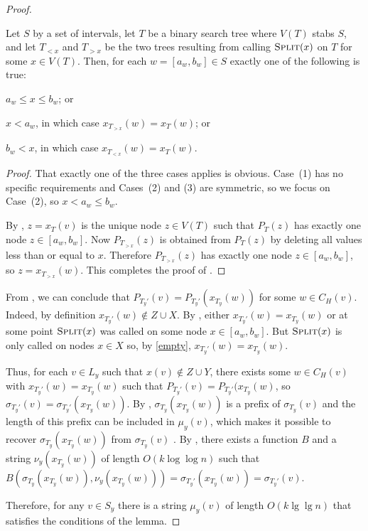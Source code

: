 \documentclass[kpfonts]{patmorin}
\let\le\leqslant
\begin{document}
\begin{proof}
  \begin{clm}
    Let $S$ by a set of intervals, let $T$ be a binary search tree where $V(T)$ stabs $S$, and let $T_{<x}$ and $T_{>x}$ be the two trees resulting from calling $\textsc{Split}(x)$ on $T$ for some $x\in V(T)$.  Then, for each $w=[a_w,b_w]\in S$ exactly one of the following is true:
    \begin{compactenum}
      \item $a_w\le x\le b_w$; or
      \item $x< a_w$, in which case $x_{T_{>x}}(w)=x_T(w)$; or
      \item $b_w < x$, in which case $x_{T_{<x}}(w)=x_T(w)$.
    \end{compactenum}
  \end{clm}

  \begin{proof}
    That exactly one of the three cases applies is obvious.  Case~(1) has no specific requirements and Cases~(2) and (3) are symmetric, so we focus on Case~(2), so $x < a_w\le b_w$.
    
    By , $z=x_T(v)$ is the unique node $z\in V(T)$ such that $P_T(z)$ has exactly one node $z\in [a_w,b_w]$.  Now $P_{T_{>x}}(z)$ is obtained from $P_T(z)$ by deleting all values less than or equal to $x$. Therefore $P_{T_{>x}}(z)$ has exactly one node $z\in[a_w,b_w]$, so $z=x_{T_{>x}}(w)$.  This completes the proof of .
  \end{proof}
  
  From , we can conclude that $P_{T_y'}(v)=P_{T_y'}(x_{T_y}(w))$ for some $w\in C_H(v)$.  Indeed, by definition $x_{T_y'}(w)\not\in Z\cup X$. By , either $x_{T_y'}(w)=x_{T_y}(w)$ or at some point $\textsc{Split}(x)$ was called on some node $x\in[a_w,b_w]$.  But $\textsc{Split}(x)$ is only called on nodes $x\in X$ so, by \eqref{empty}, $x_{T_y'}(w)=x_{T_y}(w)$.
  
  Thus, for each $v\in L_y$ such that $x(v)\not\in Z\cup Y$, there exists some $w\in C_H(v)$ with $x_{T_y'}(w)=x_{T_y}(w)$ such that $P_{T_y'}(v)=P_{T_y'}(x_{T_y}(w)$, so $\sigma_{T_y'}(v)=\sigma_{T_y'}(x_{T_y}(w))$.  By , $\sigma_{T_y}(x_{T_y}(w))$ is a prefix of $\sigma_{T_y}(v)$ and the length of this prefix can be included in $\mu_y(v)$, which makes it possible to recover $\sigma_{T_y}(x_{T_y}(w))$ from $\sigma_{T_y}(v)$ .  By , there exists a function $B$ and a string $\nu_y(x_{T_y}(w))$ of length $O(k\log\log n)$ such that $B(\sigma_{T_y}(x_{T_y}(w)), \nu_y(x_{T_y}(w))) = \sigma_{T_y'}(x_{T_y}(w)) = \sigma_{T_y'}(v)$.
  
  Therefore, for any $v\in S_y$ there is a string $\mu_y(v)$ of length $O(k\lg\lg n)$ that satisfies the conditions of the lemma.
\end{proof}
  
\end{document}
